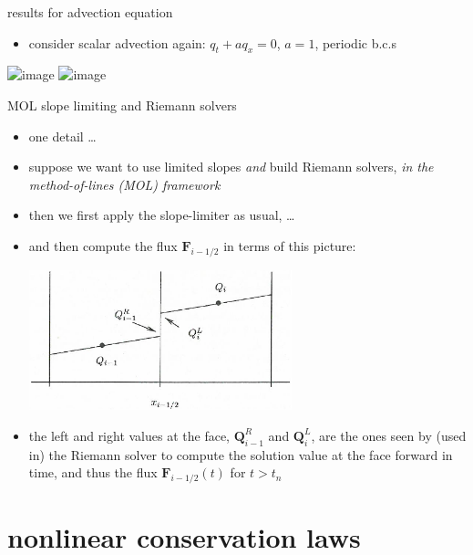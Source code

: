 \documentclass[10pt,hyperref,dvipsnames]{beamer}
\newcommand{\bF}{\mathbf{F}}
\newcommand{\bQ}{\mathbf{Q}}
\begin{document}
\begin{frame}{results for advection equation}

\begin{itemize}
\item consider scalar advection again: $q_t + a q_x=0$, $a=1$, periodic b.c.s
\end{itemize}

\begin{center}
\includegraphics<1>[width=0.7\textwidth]{figs/leveque6p1} \includegraphics<2>[width=0.7\textwidth]{figs/leveque6p2}
\end{center}
\end{frame}


\begin{frame}{MOL slope limiting and Riemann solvers}

\begin{itemize}
\item one detail \dots
\item suppose we want to use limited slopes \emph{and} build Riemann solvers, \emph{in the method-of-lines (MOL) framework}
\item then we first apply the slope-limiter as usual, \dots
\item and then compute the flux $\bF_{i-1/2}$ in terms of this picture:

\medskip
\begin{center}
\includegraphics[width=0.6\textwidth]{figs/leveque10p2}
\end{center}
\item the left and right values at the face, $\bQ_{i-1}^R$ and $\bQ_i^L$, are the ones seen by (used in) the Riemann solver to compute the solution value at the face forward in time, and thus the flux $\bF_{i-1/2}(t)$ for $t>t_n$
\end{itemize}
\end{frame}


\section{nonlinear conservation laws}
\end{document}
